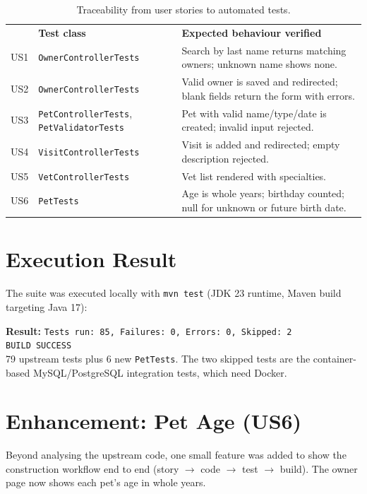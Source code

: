 \documentclass[12pt,a4paper]{report}
\newcommand{\hd}[1]{{\color{white}\bfseries #1}}
\newcommand{\headrow}{\rowcolor{navy}}
\newcommand{\code}[1]{\texttt{\small #1}}
\begin{document}
\begin{table}[H]\centering\small
\begin{tabular}{C{0.9cm} L{4.6cm} L{6.6cm}}
\headrow\hd{Story} & \hd{Test class} & \hd{Expected behaviour verified} \\
US1 & \code{OwnerControllerTests} & Search by last name returns matching owners; unknown name shows none. \\
US2 & \code{OwnerControllerTests} & Valid owner is saved and redirected; blank fields return the form with errors. \\
US3 & \code{PetControllerTests}, \code{PetValidatorTests} & Pet with valid name/type/date is created; invalid input rejected. \\
US4 & \code{VisitControllerTests} & Visit is added and redirected; empty description rejected. \\
US5 & \code{VetControllerTests} & Vet list rendered with specialties. \\
US6 & \code{PetTests} & Age is whole years; birthday counted; null for unknown or future birth date. \\
\end{tabular}
\caption{Traceability from user stories to automated tests.}
\end{table}

\section{Execution Result}
The suite was executed locally with \code{mvn test} (JDK 23 runtime, Maven build targeting
Java 17):

\begin{keybox}
\textbf{Result:} \texttt{Tests run: 85, Failures: 0, Errors: 0, Skipped: 2}\\\texttt{BUILD SUCCESS}\\
79 upstream tests plus 6 new \code{PetTests}. The two skipped tests are the container-based MySQL/PostgreSQL integration tests, which need Docker.
\end{keybox}

\section{Enhancement: Pet Age (US6)}
Beyond analysing the upstream code, one small feature was added to show the construction
workflow end to end (story $\rightarrow$ code $\rightarrow$ test $\rightarrow$ build). The owner
page now shows each pet's age in whole years.
\end{document}
